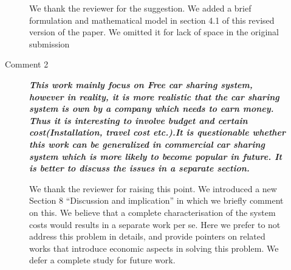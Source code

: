 \documentclass[letterpaper, 10pt]{elsarticle}
\newcommand{\rev}[1]{\textbf{\textit{#1}}}
\begin{document}
\begin{description}
\begin{description}
We thank the reviewer for the suggestion. We added a brief formulation and mathematical model in section 4.1 of this revised version of the paper. We omitted it for lack of space in the original submission



\item[Comment 2] \rev{This work mainly focus on Free car sharing system, however in reality, it is more realistic that the car sharing system is own by a company which needs to earn money. Thus it is interesting to involve budget and certain cost(Installation, travel cost etc.).It is questionable whether this work can be generalized in commercial car sharing system which is more likely to become popular in future. It is better to discuss the issues in a separate section.}

We thank the reviewer for raising this point. We introduced a new Section 8 ``Discussion and implication'' in which we briefly comment on this. We believe that a complete characterisation of the system costs would results in a separate work per se. Here we prefer to not address this problem in details, and provide pointers on related works that introduce economic aspects in solving this problem. We defer a complete study for future work.%


\end{description}
\end{description}
\end{document}
